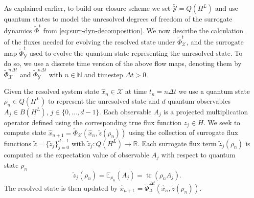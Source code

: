 \documentclass[letterpaper,10pt,3p,preprint]{elsarticle}
\newcommand{\Nbb}{\mathbb{N}}
\newcommand{\Rbb}{\mathbb{R}}
\newcommand{\Ebb}{\mathbb{E}}
\newcommand{\Xcal}{\mathcal{X}}
\newcommand{\Ycal}{\mathcal{Y}}
\DeclareMathOperator{\tr}{tr}
\begin{document}
As explained earlier, to build our closure scheme we set
$\tilde{\Ycal}=Q(H^L)$
and use quantum states to model the unresolved degrees of freedom
of the surrogate dynamics $\tilde{\Phi}^t$ from
\eqref{eq:surr-dyn-decomposition}.
We now describe the calculation of the fluxes needed for evolving the
resolved state under $\tilde{\Phi}_\Xcal^t$,
and the surrogate map $\tilde{\Phi}_\Ycal^t$
used to evolve the quantum state representing the unresolved state.
To do so, we use a discrete time version of the above flow maps,
denoting them by $\tilde{\Phi}_\Xcal^{n\Delta t}$
and $\tilde{\Phi}_\Ycal^{n\Delta t}$
with $n\in\Nbb$ and timestep $\Delta t>0$.

Given the resolved system state
$\hat{x}_n\in\Xcal$ at time $t_n=n\Delta t$
we use a quantum state $\rho_n\in Q(H^L)$
to represent the unresolved state and $d$ quantum observables
$A_j\in B(H^L)$, $j\in\{0,\ldots,d-1\}$.
Each observable $A_j$ is a projected multiplication operator
defined using the corresponding true flux function
$z_j\in H$.
We seek to compute state
$\hat{x}_{n+1}=\tilde{\Phi}_\Xcal(\hat{x}_n,
\tilde{z}(\rho_n))$
using the collection of surrogate flux functions
$\tilde{z}=\{\tilde{z}_j\}_{j=0}^{d-1}$
with $\tilde{z}_j\colon Q(H^L)\to\Rbb$.
Each surrogate flux term $\tilde{z}_j(\rho_n)$
is computed as the expectation value of observable
$A_j$ with respect to quantum state $\rho_n$
\begin{equation*}
    \tilde{z}_j(\rho_n)=\Ebb_{\rho_n}(A_j)=\tr{(\rho_nA_j)}.
\end{equation*}
The resolved state is then updated by
$\hat{x}_{n+1}=\tilde{\Phi}_\Xcal^{\Delta t}(\hat{x}_n,
\tilde{z}(\rho_n))$.
\end{document}
